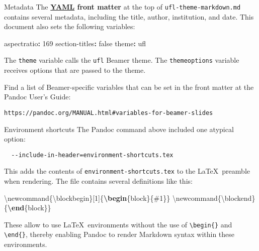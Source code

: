 \documentclass[
  ignorenonframetext,
  aspectratio=169,
]{beamer}
\newenvironment{Shaded}{}{}
\newcommand{\AttributeTok}[1]{\textcolor[rgb]{0.49,0.56,0.16}{#1}}
\newcommand{\CharTok}[1]{\textcolor[rgb]{0.25,0.44,0.63}{#1}}
\newcommand{\DecValTok}[1]{\textcolor[rgb]{0.25,0.63,0.44}{#1}}
\newcommand{\ExtensionTok}[1]{#1}
\newcommand{\FunctionTok}[1]{\textcolor[rgb]{0.02,0.16,0.49}{#1}}
\newcommand{\KeywordTok}[1]{\textcolor[rgb]{0.00,0.44,0.13}{\textbf{#1}}}
\newcommand{\NormalTok}[1]{#1}
\begin{document}
\begin{frame}[fragile]{Metadata}
\protect\hypertarget{metadata}{}
The \textbf{\href{https://yaml.org/}{YAML} front matter} at the top of
\texttt{ufl-theme-markdown.md} contains several metadata, including the
title, author, institution, and date. This document also sets the
following variables:

\begin{Shaded}
\begin{Highlighting}[]
\FunctionTok{aspectratio}\KeywordTok{:}\AttributeTok{ }\DecValTok{169}
\FunctionTok{section{-}titles}\KeywordTok{:}\AttributeTok{ }\CharTok{false}
\FunctionTok{theme}\KeywordTok{:}\AttributeTok{ ufl}
\end{Highlighting}
\end{Shaded}

The \texttt{theme} variable calls the \texttt{ufl} Beamer theme. The
\texttt{themeoptions} variable receives options that are passed to the
theme.

Find a list of Beamer-specific variables that can be set in the front
matter at the Pandoc User's Guide:

\begin{verbatim}
https://pandoc.org/MANUAL.html#variables-for-beamer-slides
\end{verbatim}
\end{frame}

\begin{frame}[fragile]{Environment shortcuts}
\protect\hypertarget{environment-shortcuts}{}
The Pandoc command above included one atypical option:

\begin{verbatim}
  --include-in-header=environment-shortcuts.tex
\end{verbatim}

This adds the contents of \texttt{environment-shortcuts.tex} to the
\LaTeX~preamble when rendering. The file contains several definitions
like this:

\begin{Shaded}
\begin{Highlighting}[]
\FunctionTok{\textbackslash{}newcommand}\NormalTok{\{}\ExtensionTok{\textbackslash{}blockbegin}\NormalTok{\}[1]\{}\KeywordTok{\textbackslash{}begin}\NormalTok{\{}\ExtensionTok{block}\NormalTok{\}\{\#1\}\}}
\FunctionTok{\textbackslash{}newcommand}\NormalTok{\{}\ExtensionTok{\textbackslash{}blockend}\NormalTok{\}\{}\KeywordTok{\textbackslash{}end}\NormalTok{\{}\ExtensionTok{block}\NormalTok{\}\}}
\end{Highlighting}
\end{Shaded}

These allow to use \LaTeX~environments without the use of
\texttt{\textbackslash{}begin\{\}} and \texttt{\textbackslash{}end\{\}},
thereby enabling Pandoc to render Markdown syntax within these
environments.
\end{frame}
\end{document}
